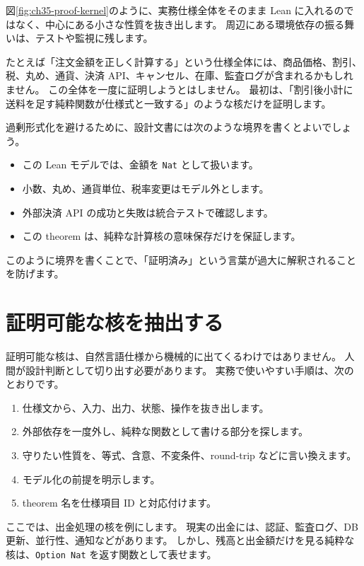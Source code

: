 
図\ref{fig:ch35-proof-kernel}のように、実務仕様全体をそのまま Lean に入れるのではなく、中心にある小さな性質を抜き出します。
周辺にある環境依存の振る舞いは、テストや監視に残します。

たとえば「注文金額を正しく計算する」という仕様全体には、商品価格、割引、税、丸め、通貨、決済 API、キャンセル、在庫、監査ログが含まれるかもしれません。
この全体を一度に証明しようとはしません。
最初は、「割引後小計に送料を足す純粋関数が仕様式と一致する」のような核だけを証明します。

過剰形式化を避けるために、設計文書には次のような境界を書くとよいでしょう。

\begin{itemize}
\item この Lean モデルでは、金額を \texttt{Nat} として扱います。
\item 小数、丸め、通貨単位、税率変更はモデル外とします。
\item 外部決済 API の成功と失敗は統合テストで確認します。
\item この theorem は、純粋な計算核の意味保存だけを保証します。
\end{itemize}

このように境界を書くことで、「証明済み」という言葉が過大に解釈されることを防げます。

\section{証明可能な核を抽出する}

証明可能な核は、自然言語仕様から機械的に出てくるわけではありません。
人間が設計判断として切り出す必要があります。
実務で使いやすい手順は、次のとおりです。

\begin{enumerate}
\item 仕様文から、入力、出力、状態、操作を抜き出します。
\item 外部依存を一度外し、純粋な関数として書ける部分を探します。
\item 守りたい性質を、等式、含意、不変条件、round-trip などに言い換えます。
\item モデル化の前提を明示します。
\item theorem 名を仕様項目 ID と対応付けます。
\end{enumerate}

ここでは、出金処理の核を例にします。
現実の出金には、認証、監査ログ、DB 更新、並行性、通知などがあります。
しかし、残高と出金額だけを見る純粋な核は、\texttt{Option Nat} を返す関数として表せます。

